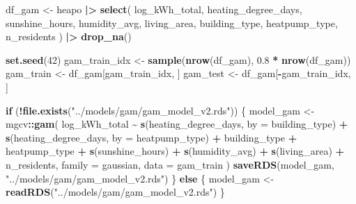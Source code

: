 \documentclass[
]{article}
\newenvironment{Shaded}{\begin{snugshade}}{\end{snugshade}}
\newcommand{\AttributeTok}[1]{\textcolor[rgb]{0.13,0.29,0.53}{#1}}
\newcommand{\ControlFlowTok}[1]{\textcolor[rgb]{0.13,0.29,0.53}{\textbf{#1}}}
\newcommand{\DecValTok}[1]{\textcolor[rgb]{0.00,0.00,0.81}{#1}}
\newcommand{\FloatTok}[1]{\textcolor[rgb]{0.00,0.00,0.81}{#1}}
\newcommand{\FunctionTok}[1]{\textcolor[rgb]{0.13,0.29,0.53}{\textbf{#1}}}
\newcommand{\NormalTok}[1]{#1}
\newcommand{\OtherTok}[1]{\textcolor[rgb]{0.56,0.35,0.01}{#1}}
\newcommand{\SpecialCharTok}[1]{\textcolor[rgb]{0.81,0.36,0.00}{\textbf{#1}}}
\newcommand{\StringTok}[1]{\textcolor[rgb]{0.31,0.60,0.02}{#1}}
\begin{document}
\begin{Shaded}
\begin{Highlighting}[]
\NormalTok{df\_gam }\OtherTok{\textless{}{-}}\NormalTok{ heapo }\SpecialCharTok{|\textgreater{}}
  \FunctionTok{select}\NormalTok{(}
\NormalTok{    log\_kWh\_total,}
\NormalTok{    heating\_degree\_days,}
\NormalTok{    sunshine\_hours,}
\NormalTok{    humidity\_avg,}
\NormalTok{    living\_area,}
\NormalTok{    building\_type,}
\NormalTok{    heatpump\_type,}
\NormalTok{    n\_residents}
\NormalTok{  ) }\SpecialCharTok{|\textgreater{}}
  \FunctionTok{drop\_na}\NormalTok{()}

\FunctionTok{set.seed}\NormalTok{(}\DecValTok{42}\NormalTok{)}
\NormalTok{gam\_train\_idx }\OtherTok{\textless{}{-}} \FunctionTok{sample}\NormalTok{(}\FunctionTok{nrow}\NormalTok{(df\_gam), }\FloatTok{0.8} \SpecialCharTok{*} \FunctionTok{nrow}\NormalTok{(df\_gam))}
\NormalTok{gam\_train }\OtherTok{\textless{}{-}}\NormalTok{ df\_gam[gam\_train\_idx, ]}
\NormalTok{gam\_test }\OtherTok{\textless{}{-}}\NormalTok{ df\_gam[}\SpecialCharTok{{-}}\NormalTok{gam\_train\_idx, ]}
\end{Highlighting}
\end{Shaded}

\begin{Shaded}
\begin{Highlighting}[]
\ControlFlowTok{if}\NormalTok{ (}\SpecialCharTok{!}\FunctionTok{file.exists}\NormalTok{(}\StringTok{"../models/gam/gam\_model\_v2.rds"}\NormalTok{)) \{}
\NormalTok{  model\_gam }\OtherTok{\textless{}{-}}\NormalTok{ mgcv}\SpecialCharTok{::}\FunctionTok{gam}\NormalTok{(}
\NormalTok{    log\_kWh\_total }\SpecialCharTok{\textasciitilde{}}
      \FunctionTok{s}\NormalTok{(heating\_degree\_days, }\AttributeTok{by =}\NormalTok{ building\_type) }\SpecialCharTok{+}
      \FunctionTok{s}\NormalTok{(heating\_degree\_days, }\AttributeTok{by =}\NormalTok{ heatpump\_type) }\SpecialCharTok{+}
\NormalTok{      building\_type }\SpecialCharTok{+}
\NormalTok{      heatpump\_type }\SpecialCharTok{+}
      \FunctionTok{s}\NormalTok{(sunshine\_hours) }\SpecialCharTok{+}
      \FunctionTok{s}\NormalTok{(humidity\_avg) }\SpecialCharTok{+}
      \FunctionTok{s}\NormalTok{(living\_area) }\SpecialCharTok{+}
\NormalTok{      n\_residents,}
    \AttributeTok{family =}\NormalTok{ gaussian,}
    \AttributeTok{data =}\NormalTok{ gam\_train}
\NormalTok{  )}
  \FunctionTok{saveRDS}\NormalTok{(model\_gam, }\StringTok{"../models/gam/gam\_model\_v2.rds"}\NormalTok{)}
\NormalTok{\} }\ControlFlowTok{else}\NormalTok{ \{}
\NormalTok{  model\_gam }\OtherTok{\textless{}{-}} \FunctionTok{readRDS}\NormalTok{(}\StringTok{"../models/gam/gam\_model\_v2.rds"}\NormalTok{)}
\NormalTok{\}}
\end{Highlighting}
\end{Shaded}
\end{document}
